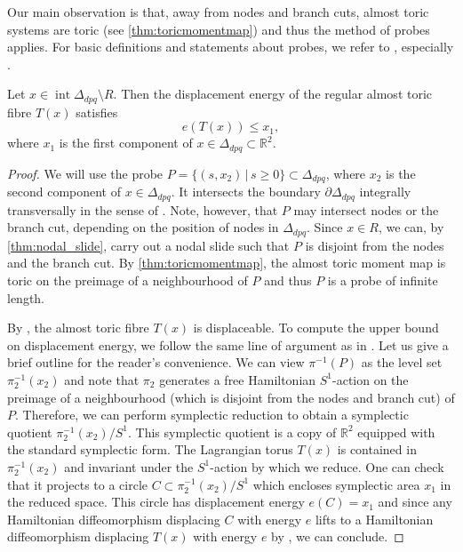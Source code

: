 \documentclass[12pt,a4paper,draft]{scrartcl}
\begin{document}
Our main observation is that, away from nodes and branch cuts, almost toric systems are toric (see \cref{thm:toricmomentmap}) and thus the method of probes applies. For basic definitions and statements about probes, we refer to \cite{mcduff2011displacing}, especially \cite[Definition 2.3, Lemma 2.4]{mcduff2011displacing}.


\begin{lemma}
    \label{thm:upper_bound}
    Let $x \in \operatorname{int} \Delta_{dpq} \setminus R$. Then the displacement energy of the regular almost toric fibre $T(x)$ satisfies
    \[ e(T(x))\leq x_1, \]
    where $x_1$ is the first component of $x \in \Delta_{dpq} \subset \mathbb{R}^2$.
\end{lemma}


\begin{proof}
We will use the probe $P = \{(s,x_2) \, \vert \, s ≥ 0\} \subset \Delta_{dpq}$, where $x_2$ is the second component of $x \in \Delta_{dpq}$. It intersects the boundary $∂ \Delta_{dpq}$ integrally transversally in the sense of \cite[Section 2.1]{mcduff2011displacing}. Note, however, that $P$ may intersect nodes or the branch cut, depending on the position of nodes in $\Delta_{dpq}$. Since $x \in R$, we can, by \cref{thm:nodal_slide}, carry out a nodal slide such that $P$ is disjoint from the nodes and the branch cut. By \cref{thm:toricmomentmap}, the almost toric moment map is toric on the preimage of a neighbourhood of $P$ and thus $P$ is a probe of infinite length. 

By \cite[Lemma 2.4]{mcduff2011displacing}, the almost toric fibre $T(x)$ is displaceable. To compute the upper bound on displacement energy, we follow the same line of argument as in \cite[Proposition 3.4]{brendel2020real}. Let us give a brief outline for the reader's convenience. We can view $\pi^{-1}(P)$ as the level set $\pi_2^{-1}(x_2)$ and note that $\pi_2$ generates a free Hamiltonian $S^1$-action on the preimage of a neighbourhood (which is disjoint from the nodes and branch cut) of $P$. Therefore, we can perform symplectic reduction to obtain a symplectic quotient $\pi_2^{-1}(x_2)/S^1$. This symplectic quotient is a copy of $\mathbb{R}^2$ equipped with the standard symplectic form. The Lagrangian torus $T(x)$ is contained in $\pi_2^{-1}(x_2)$ and invariant under the $S^1$-action by which we reduce. One can check that it projects to a circle $C \subset \pi_2^{-1}(x_2)/S^1$ which encloses symplectic area $x_1$ in the reduced space. This circle has displacement energy $e(C) = x_1$ and since any Hamiltonian diffeomorphism displacing $C$ with energy $e$ lifts to a Hamiltonian diffeomorphism displacing $T(x)$ with energy $e$ by \cite[Lemma 3.1]{brendel2020real}, we can conclude.
\end{proof}
\end{document}
